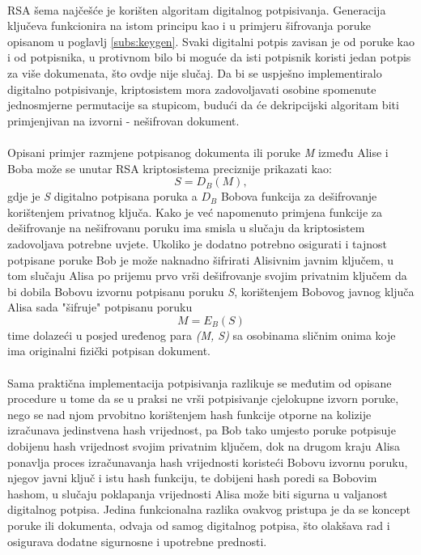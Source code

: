 \paragraph*{}
RSA šema najčešće je korišten algoritam digitalnog potpisivanja. Generacija ključeva funkcionira na istom principu kao i u primjeru šifrovanja poruke opisanom u poglavlj \ref{subs:keygen}. Svaki digitalni potpis zavisan je od poruke kao i od potpisnika, u protivnom bilo bi moguće da isti potpisnik koristi jedan potpis za više dokumenata, što ovdje nije slučaj. Da bi se uspješno implementiralo digitalno potpisivanje, kriptosistem mora zadovoljavati osobine spomenute jednosmjerne permutacije sa stupicom, budući da će dekripcijski algoritam biti primjenjivan na izvorni - nešifrovan dokument.

\paragraph*{}
Opisani primjer razmjene potpisanog dokumenta ili poruke \textit{M} između Alise i Boba može se unutar RSA kriptosistema preciznije prikazati kao: \[S = D_{B}(M),\] gdje je \textit{S} digitalno potpisana poruka a \(D_{B}\) Bobova funkcija za dešifrovanje korištenjem privatnog ključa. Kako je već napomenuto primjena funkcije za dešifrovanje na nešifrovanu poruku ima smisla u slučaju da kriptosistem zadovoljava potrebne uvjete. Ukoliko je dodatno potrebno osigurati i tajnost potpisane poruke Bob je može naknadno šifrirati Alisivnim javnim ključem, u tom slučaju Alisa po prijemu prvo vrši dešifrovanje svojim privatnim ključem da bi dobila Bobovu izvornu potpisanu poruku \textit{S}, korištenjem Bobovog javnog ključa Alisa sada "šifruje" potpisanu poruku \[M = E_{B}(S)\] time dolazeći u posjed uređenog para \textit{(M, S)} sa osobinama sličnim onima koje ima originalni fizički potpisan dokument.

\paragraph*{}
Sama praktična implementacija potpisivanja razlikuje se međutim od opisane procedure u tome da se u praksi ne vrši potpisivanje cjelokupne izvorn poruke, nego se nad njom prvobitno korištenjem hash funkcije otporne na kolizije izračunava jedinstvena hash vrijednost, pa Bob tako umjesto poruke potpisuje dobijenu hash vrijednost svojim privatnim ključem, dok na drugom kraju Alisa ponavlja proces izračunavanja hash vrijednosti koristeći Bobovu izvornu poruku, njegov javni ključ i istu hash funkciju, te dobijeni hash poredi sa Bobovim hashom, u slučaju poklapanja vrijednosti Alisa može biti sigurna u valjanost digitalnog potpisa. Jedina funkcionalna razlika ovakvog pristupa je da se koncept poruke ili dokumenta, odvaja od samog digitalnog potpisa, što olakšava rad i osigurava dodatne sigurnosne i upotrebne prednosti.

